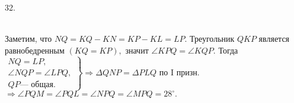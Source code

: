 32. \begin{figure}[ht!]
\end{figure}\\
Заметим, что $NQ=KQ-KN=KP-KL=LP.$ Треугольник $QKP$ является равнобедренным $(KQ=KP),$ значит $\angle KPQ=\angle KQP.$ Тогда
$\left.\begin{array}{l}NQ=LP,\\
\angle NQP=\angle LPQ,\\
QP\text{--- общая.}  \end{array}\right\}\Rightarrow \Delta QNP=\Delta PLQ\text{ по I призн.}$\\$\Rightarrow \angle PQM=\angle PQL=\angle NPQ=\angle MPQ=28^\circ.$\\
